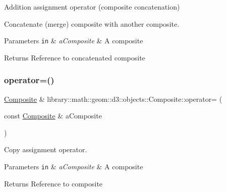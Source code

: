 Addition assignment operator (composite concatenation) 

Concatenate (merge) composite with another composite.


\begin{DoxyParams}[1]{Parameters}
\mbox{\tt in}  & {\em a\+Composite} & A composite \\
\hline
\end{DoxyParams}
\begin{DoxyReturn}{Returns}
Reference to concatenated composite 
\end{DoxyReturn}
\mbox{\label{classlibrary_1_1math_1_1geom_1_1d3_1_1objects_1_1_composite_ab33fc9368c5ee10fc1cd5d6baf08ef10}} 
\subsubsection{\texorpdfstring{operator=()}{operator=()}}
{\footnotesize\ttfamily \hyperlink{classlibrary_1_1math_1_1geom_1_1d3_1_1objects_1_1_composite}{Composite} \& library\+::math\+::geom\+::d3\+::objects\+::\+Composite\+::operator= (\begin{DoxyParamCaption}\item[{const \hyperlink{classlibrary_1_1math_1_1geom_1_1d3_1_1objects_1_1_composite}{Composite} \&}]{a\+Composite }\end{DoxyParamCaption})}



Copy assignment operator. 


\begin{DoxyParams}[1]{Parameters}
\mbox{\tt in}  & {\em a\+Composite} & A composite \\
\hline
\end{DoxyParams}
\begin{DoxyReturn}{Returns}
Reference to composite 
\end{DoxyReturn}
\mbox{\label{classlibrary_1_1math_1_1geom_1_1d3_1_1objects_1_1_composite_aaa79c2df606ffe1eac58aaa2cb5b39d2}} 
